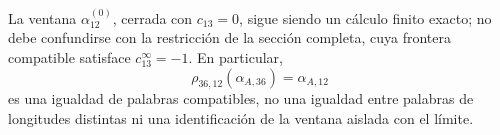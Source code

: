 La ventana \(\alpha_{12}^{(0)}\), cerrada con \(c_{13}=0\), sigue siendo un
cálculo finito exacto; no debe confundirse con la restricción de la sección
completa, cuya frontera compatible satisface \(c_{13}^{\infty}=-1\). En
particular,
\begin{equation}
 \rho_{36,12}(\alpha_{A,36})=\alpha_{A,12}
 \label{eq:alpha-rho-36-12-proyectiva}
\end{equation}
es una igualdad de palabras compatibles, no una igualdad entre palabras de
longitudes distintas ni una identificación de la ventana aislada con el
límite.



